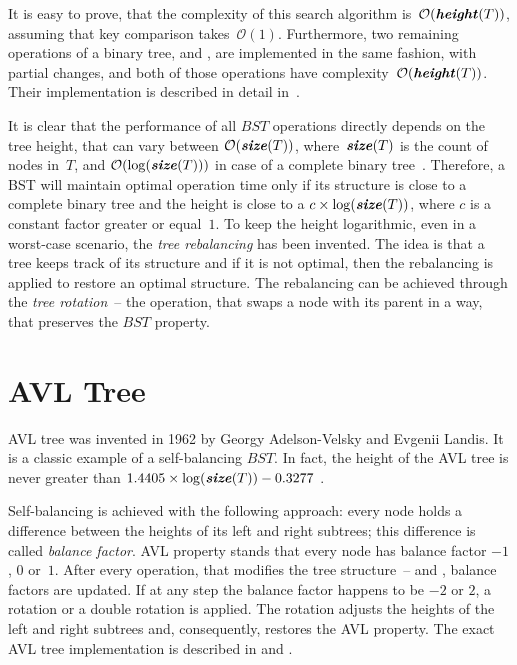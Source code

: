 It is easy to prove, that the complexity of this search algorithm is~$\mathcal{O}(\textbf{\textit{height}}(T))$, assuming that key comparison takes~$\mathcal{O}(1)$. Furthermore, two remaining operations of a binary tree, \insertop and \removeop, are implemented in the same fashion, with partial changes, and both of those operations have complexity~$\mathcal{O}(\textbf{\textit{height}}(T))$. Their implementation is described in detail in~\cite{sedgewick}.

It is clear that the performance of all $BST$ operations  directly depends on the tree height, that can vary between $\mathcal{O}(\textbf{\textit{size}}(T))$, where~$\textbf{\textit{size}}(T)$ is the count of nodes in~$T$,
 and $\mathcal{O}(\log(\textbf{\textit{size}}(T)))$ in case of a complete binary tree~\cite{complete_bt}. Therefore, a BST will maintain optimal operation time only if its structure is close to a complete binary tree and the height is close to a $c \times \log(\textbf{\textit{size}}(T))$, where $c$ is a constant factor greater or equal~$1$. To keep the height logarithmic, even in a worst-case scenario, the \emph{tree rebalancing} has been invented. The idea is that a tree keeps track of its structure and if it is not optimal, then the rebalancing is applied to restore an optimal structure. The rebalancing can be achieved through the \emph{tree rotation}\cite{sedgewick}~-- the operation, that swaps a node with its parent in a way, that preserves the $BST$ property.


\section{AVL Tree}

AVL tree was invented in 1962 by Georgy Adelson-Velsky and Evgenii Landis\cite{avl_tree}. It is a classic example of a self-balancing $BST$. In fact, the height of the AVL tree is never greater than $1.4405\times \log(\textbf{\textit{size}}(T)) - 0.3277$ \cite[p.~460]{knuth3}.

Self-balancing is achieved with the following approach: every node holds a difference between the heights of its left and right subtrees; this difference is called \emph{balance factor}.
AVL property stands that every node has balance factor $-1$, $0$ or~$1$. After every operation, that modifies the tree structure~-- \insertop and \removeop, balance factors are updated.
If at any step the balance factor happens to be $-2$ or $2$, a rotation or a double rotation is applied.
The rotation adjusts the heights of the left and right subtrees and, consequently, restores the AVL property. The exact AVL tree implementation is described in \cite{sedgewick} and \cite{cormen}.

